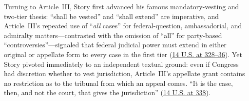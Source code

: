 \documentclass[12pt]{article}
\begin{document}
Turning to Article~III, Story first advanced his famous mandatory-vesting and two-tier thesis: ``shall be vested'' and ``shall extend'' are imperative, and Article~III's repeated use of ``\textit{all} cases'' for federal-question, ambassadorial, and admiralty matters---contrasted with the omission of ``all'' for party-based ``controversies''---signaled that federal judicial power must extend in either original or appellate form to every case in the first tier (\href{https://supreme.justia.com/cases/federal/us/14/304/}{14 U.S. at 328--36}). Yet Story pivoted immediately to an independent textual ground: even if Congress had discretion whether to vest jurisdiction, Article~III's appellate grant contains no restriction as to the tribunal from which an appeal comes. ``It is the case, then, and not the court, that gives the jurisdiction'' (\href{https://supreme.justia.com/cases/federal/us/14/304/}{14 U.S. at 338}).
\end{document}

